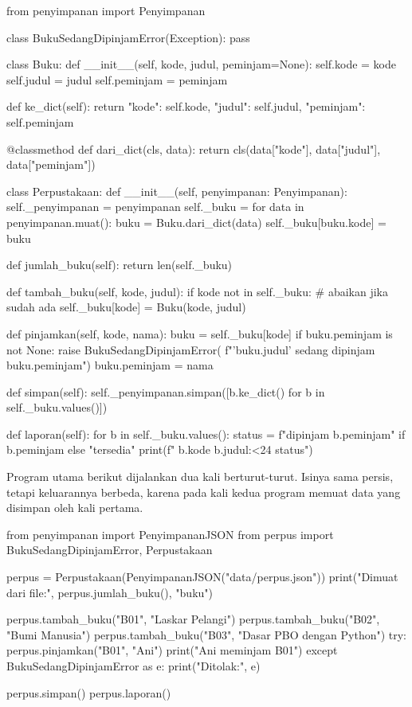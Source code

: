 \begin{kode}[perpus.py]
from penyimpanan import Penyimpanan

class BukuSedangDipinjamError(Exception):
    pass

class Buku:
    def __init__(self, kode, judul, peminjam=None):
        self.kode = kode
        self.judul = judul
        self.peminjam = peminjam

    def ke_dict(self):
        return {"kode": self.kode, "judul": self.judul,
                "peminjam": self.peminjam}

    @classmethod
    def dari_dict(cls, data):
        return cls(data["kode"], data["judul"], data["peminjam"])

class Perpustakaan:
    def __init__(self, penyimpanan: Penyimpanan):
        self._penyimpanan = penyimpanan
        self._buku = {}
        for data in penyimpanan.muat():
            buku = Buku.dari_dict(data)
            self._buku[buku.kode] = buku

    def jumlah_buku(self):
        return len(self._buku)

    def tambah_buku(self, kode, judul):
        if kode not in self._buku:                  # abaikan jika sudah ada
            self._buku[kode] = Buku(kode, judul)

    def pinjamkan(self, kode, nama):
        buku = self._buku[kode]
        if buku.peminjam is not None:
            raise BukuSedangDipinjamError(
                f"'{buku.judul}' sedang dipinjam {buku.peminjam}")
        buku.peminjam = nama

    def simpan(self):
        self._penyimpanan.simpan([b.ke_dict() for b in self._buku.values()])

    def laporan(self):
        for b in self._buku.values():
            status = f"dipinjam {b.peminjam}" if b.peminjam else "tersedia"
            print(f"  {b.kode}  {b.judul:<24} {status}")
\end{kode}

Program utama berikut dijalankan dua kali berturut-turut. Isinya sama persis, tetapi keluarannya berbeda, karena pada kali kedua program memuat data yang disimpan oleh kali pertama.

\begin{kode}[main.py]
from penyimpanan import PenyimpananJSON
from perpus import BukuSedangDipinjamError, Perpustakaan

perpus = Perpustakaan(PenyimpananJSON("data/perpus.json"))
print("Dimuat dari file:", perpus.jumlah_buku(), "buku")

perpus.tambah_buku("B01", "Laskar Pelangi")
perpus.tambah_buku("B02", "Bumi Manusia")
perpus.tambah_buku("B03", "Dasar PBO dengan Python")
try:
    perpus.pinjamkan("B01", "Ani")
    print("Ani meminjam B01")
except BukuSedangDipinjamError as e:
    print("Ditolak:", e)

perpus.simpan()
perpus.laporan()
\end{kode}

